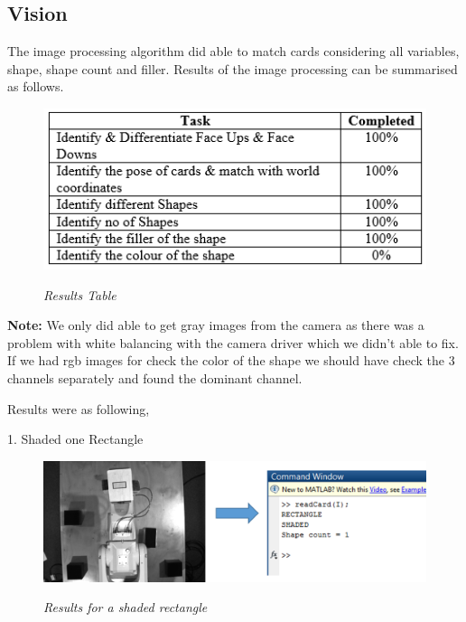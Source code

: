 \subsection{Vision}
The image processing algorithm did able to match cards considering all variables, shape, shape count and filler. Results of the image processing can be summarised as follows.
\begin{figure}[position = here]
	\begin{centering}
		\includegraphics[scale=0.8]{./sachiths_images/image7.png}\\
		\caption[]{\textit{Results Table}}
	\end{centering}
\end{figure}

\textbf{Note:} We only did able to get gray images from the camera as there was a problem with white balancing with the camera driver which we didn't able to fix. If we had rgb images for check the color of the shape we should have check the 3 channels separately and found the dominant channel. 

Results were as following,

1. Shaded one Rectangle
\begin{figure}[position = here]
	\begin{centering}
		\includegraphics[scale=0.5]{./sachiths_images/image9.png}\\
		\caption[]{\textit{Results for a shaded rectangle}}
	\end{centering}
\end{figure}

